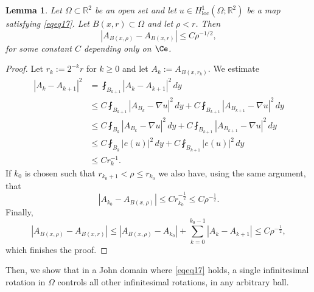 \documentclass[12pt]{article}
\newtheorem{lemma}[theorem]{Lemma}
\theoremstyle{definition}
\theoremstyle{remark}
\numberwithin{equation}{section}
\newcommand{\abs}[1]{\lvert #1 \rvert}
\newcommand{\R}{\mathbb{R}}
\begin{document}
\begin{lemma}\label{LemmaMovRig2}
    Let $\Omega\subset\R^2$ be an open set and let $u\in H^1_{\mathrm{loc}}(\Omega;\R^2)$ be a map satisfying \eqref{eqeq17}.
    Let $B(x,r)\subset\Omega$ and let  $\rho <r$.    Then
    \begin{equation}
        |A_{B(x,\rho )}-A_{B(x,r)}|\leq C \rho^{-1/2},
    \end{equation}
    for some constant $C$ depending only on $\Ce$.
\end{lemma}
\begin{proof} Let $r_k := 2^{-k}r$ for $k\geq 0$ and let $A_k:=A_{B(x,r_k)}$. We estimate 
    \begin{align*}
        |A_{k}-A_{k+1}|^2 &= \fint_{B_{k+1}} |A_{k}-A_{k+1}|^2 \, dy\\
                          &\leq C  \fint_{B_{k+1}} |A_{B_k}-\nabla u|^2 \, dy + C \fint_{B_{k+1}} |A_{B_{k+1}}-\nabla u|^2 \, dy\\
                          &\leq C  \fint_{B_{k}} |A_{B_k}-\nabla u|^2 \, dy + C \fint_{B_{k+1}} |A_{B_{k+1}}-\nabla u|^2 \, dy\\
                          &\leq C \fint_{B_k} \abs{e(u)}^2 \, dy + C \fint_{B_{k+1}} \abs{e(u)}^2 \, dy\\
                          &\leq C  r_k^{-1}.
    \end{align*}
    If $k_0$ is chosen such that $r_{k_0+1}< \rho \leq r_{k_0}$ we also have, using the same argument,  that 
    \[|A_{k_0}-A_{B(x,\rho)}|\leq Cr_{k_0}^{-\frac{1}{2}}\leq C \rho^{-\frac{1}{2}}.\]
    Finally,
    \[|A_{B(x,\rho)} - A_{B(x,r)}|\leq |A_{B(x,\rho)} - A_{k_0}| + \sum_{k=0}^{k_0-1} |A_k - A_{k+1}| \leq C
    \rho^{-\frac{1}{2}},\]
    which finishes the proof.
\end{proof}

Then, we show that in a John domain where \eqref{eqeq17} holds, a single infinitesimal rotation in $\Omega$ controls
all other infinitesimal rotations, in any arbitrary ball.
\end{document}
